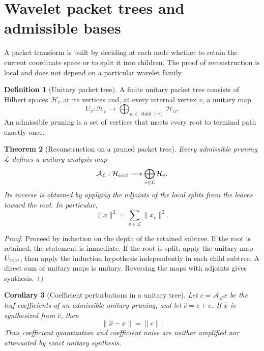\documentclass[11pt,a4paper]{article}
\newtheorem{theorem}{Theorem}[section]
\newtheorem{corollary}[theorem]{Corollary}
\theoremstyle{definition}
\newtheorem{definition}[theorem]{Definition}
\theoremstyle{remark}
\newcommand{\Acal}{\mathcal A}
\newcommand{\Hcal}{\mathcal H}
\newcommand{\Lcal}{\mathcal L}
\begin{document}
\section{Wavelet packet trees and admissible bases}\label{extension:section:06}\label{sec:packet_trees}

A packet transform is built by deciding at each node whether to retain the current coordinate space or to split it into children. The proof of reconstruction is local and does not depend on a particular wavelet family.

\begin{definition}[Unitary packet tree]\label{def:unitary_packet_tree}
A finite unitary packet tree consists of Hilbert spaces \(\Hcal_v\) at its vertices and, at every internal vertex \(v\), a unitary map
\[
U_v:\Hcal_v\longrightarrow\bigoplus_{w\in\operatorname{child}(v)}\Hcal_w.
\]
An admissible pruning is a set of vertices that meets every root to terminal path exactly once.
\end{definition}

\begin{theorem}[Reconstruction on a pruned packet tree]\label{thm:pruned_packet_tree}
Every admissible pruning \(\Lcal\) defines a unitary analysis map
\[
\Acal_{\Lcal}:\Hcal_{\rm root}
\longrightarrow
\bigoplus_{v\in\Lcal}\Hcal_v.
\]
Its inverse is obtained by applying the adjoints of the local splits from the leaves toward the root. In particular,
\[
\|x\|^2
=
\sum_{v\in\Lcal}\|x_v\|^2.
\]
\end{theorem}

\begin{proof}
Proceed by induction on the depth of the retained subtree. If the root is retained, the statement is immediate. If the root is split, apply the unitary map \(U_{\rm root}\), then apply the induction hypothesis independently in each child subtree. A direct sum of unitary maps is unitary. Reversing the maps with adjoints gives synthesis.
\end{proof}

\begin{corollary}[Coefficient perturbations in a unitary tree]\label{cor:unitary_tree_noise}
Let \(c=\Acal_{\Lcal}x\) be the leaf coefficients of an admissible unitary pruning, and let \(\widehat c=c+e\). If \(\widehat x\) is synthesized from \(\widehat c\), then
\[
\|\widehat x-x\|=\|e\|.
\]
Thus coefficient quantization and coefficient noise are neither amplified nor attenuated by exact unitary synthesis.
\end{corollary}
\end{document}
